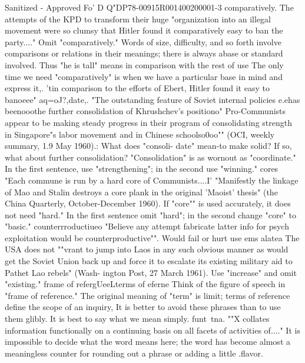 \documentclass[
    oneside,
    11pt,
    draft
]{memoir}
\begin{document}
Sanitized - Approved Fo' D Q"DP78-00915R001400200001-3 comparatively. The attempts of the KPD to transform their huge "organization into an illegal movement were so clumsy that Hitler found it comparatively easy to ban the party...." Omit "comparatively." Words of size, difficulty, and so forth involve comparisons or relations in their meanings; there is always abase or standard involved. Thus "he is tall" means in comparison with the rest of use The only time we need "comparatively" is when we have a particular base in mind and express it,. 'tin comparison to the efforts of Ebert, Hitler found it easy to banoeee" aq=oJ?,date,. "The outstanding feature of Soviet internal policies e.ehas beenooothe further consolidation of Khrushchev's positiono" Pro-Communists appear to be making steady progress in their program of consolidating strength in Singapore"s labor movement and in Chinese schoolso0oo"" (OCI, weekly summary, 1.9 May 1960).: What does "consoli- date" mean-to make solid? If so, what about further consolidation? "Consolidation" is as wornout as "coordinate." In the first sentence, use "strengthening"; in the second use "winning." cores "Each commune is run by a hard core of Communists....I' "Manifestly the linkage of Mao and Stalin destroys a core plank in the original 'Maoist' thesis" (the China Quarterly, October-December 1960). If "core"" is used accurately, it does not need "hard." In the first sentence omit "hard"; in the second change "core" to "basic." counterrroductiueo "Believe any attempt fabricate latter info for psych exploitation would be counterproductive"". Would fail or hurt use ems alatea The USA does not ""vrant to jump into Laos in any such obvious manner as would get the Soviet Union back up and force it to escalate its existing military aid to Pathet Lao rebels" (Wash- ington Post, 27 March 1961). Use "increase" and omit "existing." frame of refergUeeLterms of eferne Think of the figure of speech in "frame of reference." The original meaning of "term" is limit; terms of reference define the scope of an inquiry, It is better to avoid these phrases than to use them glibly. It is best to say what we mean simply. funt~tna. ""X collates information functionally on a continuing basis on all facets of activities of...." It is impossible to decide what the word means here; the word has become almost a meaningless counter for rounding out a phrase or adding a little .flavor.
\end{document}
